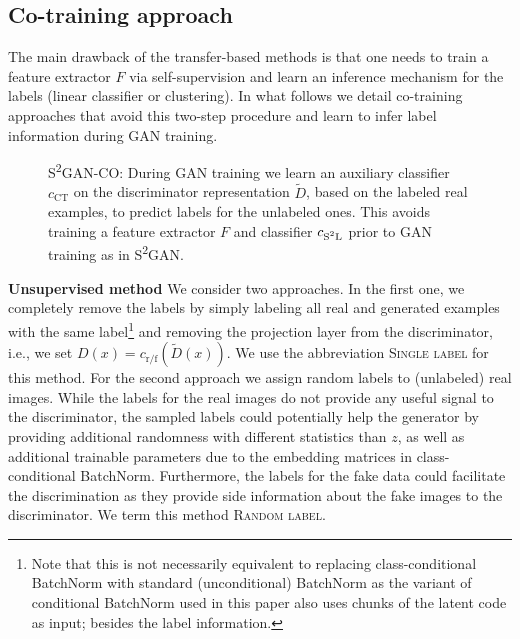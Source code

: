 \documentclass{article}
\newcommand{\cCT}{c_\text{CT}}
\newcommand{\cSSL}{c_\text{S\textsuperscript{2}L}}
\newcommand{\cRF}{c_\text{r/f}}
\newcommand{\Dt}{\tilde D}
\newcommand{\cotrainSS}{\textsc{S\textsuperscript{2}GAN-CO}}
\newcommand{\tranSS}{\textsc{S\textsuperscript{2}GAN}}
\newcommand{\slabels}{\textsc{Single label}}
\newcommand{\rlabels}{\textsc{Random label}}
\begin{document}
\subsection{Co-training approach} \label{sec:directmethods}
The main drawback of the transfer-based methods is that one needs to train a feature extractor $F$ via self-supervision and learn an inference mechanism for the labels (linear classifier or clustering). In what follows we detail co-training approaches that avoid this two-step procedure and learn to infer label information during GAN training.

\begin{figure}[t]
\centering
{}
\caption{\cotrainSS{}: During GAN training we learn an auxiliary classifier $\cCT$ on the discriminator representation $\Dt$, based on the labeled real examples, to predict labels for the unlabeled ones. This avoids training a feature extractor $F$ and classifier $\cSSL$ prior to GAN training as in \tranSS{}. \label{fig:cotrained}} 
\end{figure}
\textbf{Unsupervised method}\quad
We consider two approaches. In the first one, we completely remove the labels by simply labeling all real and generated examples with the same label\footnote{Note that this is not necessarily equivalent to replacing class-conditional BatchNorm with standard (unconditional) BatchNorm as the variant of conditional BatchNorm used in this paper also uses chunks of the latent code as input;  besides the label information.} and removing the projection layer from the discriminator, i.e., we set $D(x) = \cRF(\Dt(x))$. We use the abbreviation \slabels{} for this method. For the second approach we assign random labels to (unlabeled) real images. While the labels for the real images do not provide any useful signal to the discriminator, the sampled labels could potentially help the generator by providing additional randomness with different statistics than $z$, as well as additional trainable parameters due to the embedding matrices in class-conditional BatchNorm. Furthermore, the labels for the fake data could facilitate the discrimination as they provide side information about the fake images to the discriminator. We term this method \rlabels{}.
\end{document}
